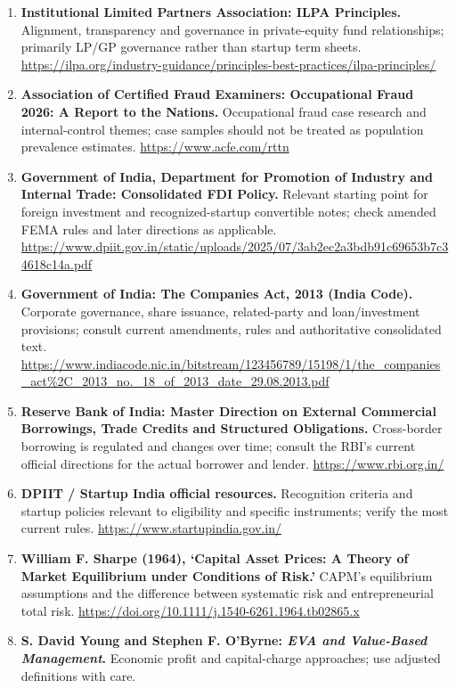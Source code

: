 \begin{enumerate}
    \item \textbf{Institutional Limited Partners Association: ILPA Principles.} Alignment, transparency and governance in private-equity fund relationships; primarily LP/GP governance rather than startup term sheets. \url{https://ilpa.org/industry-guidance/principles-best-practices/ilpa-principles/}
    \item \textbf{Association of Certified Fraud Examiners: Occupational Fraud 2026: A Report to the Nations.} Occupational fraud case research and internal-control themes; case samples should not be treated as population prevalence estimates. \url{https://www.acfe.com/rttn}
    \item \textbf{Government of India, Department for Promotion of Industry and Internal Trade: Consolidated FDI Policy.} Relevant starting point for foreign investment and recognized-startup convertible notes; check amended FEMA rules and later directions as applicable. \url{https://www.dpiit.gov.in/static/uploads/2025/07/3ab2ec2a3bdb91c69653b7c34618c14a.pdf}
    \item \textbf{Government of India: The Companies Act, 2013 (India Code).} Corporate governance, share issuance, related-party and loan/investment provisions; consult current amendments, rules and authoritative consolidated text. \url{https://www.indiacode.nic.in/bitstream/123456789/15198/1/the_companies_act%2C_2013_no._18_of_2013_date_29.08.2013.pdf}
    \item \textbf{Reserve Bank of India: Master Direction on External Commercial Borrowings, Trade Credits and Structured Obligations.} Cross-border borrowing is regulated and changes over time; consult the RBI's current official directions for the actual borrower and lender. \url{https://www.rbi.org.in/}
    \item \textbf{DPIIT / Startup India official resources.} Recognition criteria and startup policies relevant to eligibility and specific instruments; verify the most current rules. \url{https://www.startupindia.gov.in/}
    \item \textbf{William F. Sharpe (1964), `Capital Asset Prices: A Theory of Market Equilibrium under Conditions of Risk.'} CAPM's equilibrium assumptions and the difference between systematic risk and entrepreneurial total risk. \url{https://doi.org/10.1111/j.1540-6261.1964.tb02865.x}
    \item \textbf{S. David Young and Stephen F. O'Byrne: \textit{EVA and Value-Based Management}.} Economic profit and capital-charge approaches; use adjusted definitions with care.

\end{enumerate}
